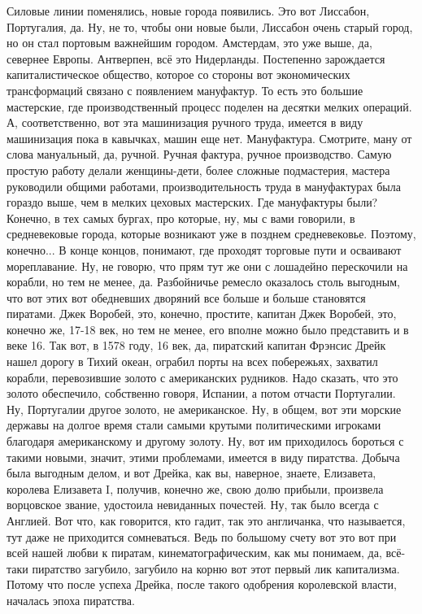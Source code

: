 Силовые линии поменялись, новые города появились.
Это вот Лиссабон, Португалия, да. Ну, не то, чтобы они новые были, Лиссабон
очень старый город, но он стал портовым важнейшим городом. Амстердам, это уже
выше, да, севернее Европы. Антверпен, всё это Нидерланды. Постепенно зарождается
капиталистическое общество, которое со стороны вот экономических трансформаций
связано с появлением мануфактур. То есть это большие мастерские, где
производственный процесс поделен на десятки мелких операций. А, соответственно,
вот эта машинизация ручного труда, имеется в виду машинизация пока в кавычках,
машин еще нет. Мануфактура. Смотрите, ману от слова мануальный, да, ручной.
Ручная фактура, ручное производство. Самую простую работу делали женщины-дети,
более сложные подмастерия, мастера руководили общими работами,
производительность труда в мануфактурах была гораздо выше, чем в мелких цеховых
мастерских. Где мануфактуры были? Конечно, в тех самых бургах, про которые, ну,
мы с вами говорили, в средневековые города, которые возникают уже в позднем
средневековье. Поэтому, конечно... В конце концов, понимают, где проходят
торговые пути и осваивают мореплавание. Ну, не говорю, что прям тут же они с
лошадейно перескочили на корабли, но тем не менее, да. Разбойничье ремесло
оказалось столь выгодным, что вот этих вот обедневших дворяний все больше и
больше становятся пиратами. Джек Воробей, это, конечно, простите, капитан Джек
Воробей, это, конечно же, 17-18 век, но тем не менее, его вполне можно было
представить и в веке 16. Так вот, в 1578 году, 16 век, да, пиратский капитан
Фрэнсис Дрейк нашел дорогу в Тихий океан, ограбил порты на всех побережьях,
захватил корабли, перевозившие золото с американских рудников. Надо сказать, что
это золото обеспечило, собственно говоря, Испании, а потом отчасти Португалии.
Ну, Португалии другое золото, не американское. Ну, в общем, вот эти морские
державы на долгое время стали самыми крутыми политическими игроками благодаря
американскому и другому золоту. Ну, вот им приходилось бороться с такими новыми,
значит, этими проблемами, имеется в виду пиратства. Добыча была выгодным делом,
и вот Дрейка, как вы, наверное, знаете, Елизавета, королева Елизавета I,
получив, конечно же, свою долю прибыли, произвела ворцовское звание, удостоила
невиданных почестей. Ну, так было всегда с Англией. Вот что, как говорится, кто
гадит, так это англичанка, что называется, тут даже не приходится сомневаться.
Ведь по большому счету вот это вот при всей нашей любви к пиратам,
кинематографическим, как мы понимаем, да, всё-таки пиратство загубило, загубило
на корню вот этот первый лик капитализма. Потому что после успеха Дрейка, после
такого одобрения королевской власти, началась эпоха пиратства. 

